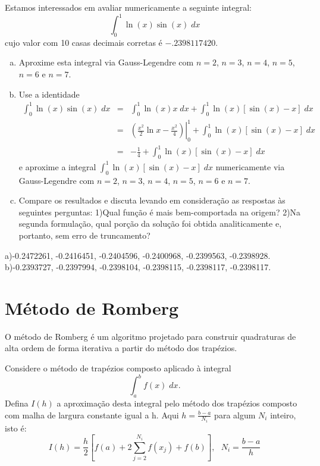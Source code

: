 \begin{exer}
Estamos interessados em avaliar numericamente a seguinte integral:
\begin{equation} \int_0^1 \ln(x)\sin(x)\;dx \end{equation}
cujo valor com 10 casas decimais corretas é $-.2398117420$.
\begin{enumerate}[a)]
\item Aproxime esta integral via Gauss-Legendre com $n=2$, $n=3$, $n=4$, $n=5$, $n=6$ e $n=7$.
\item Use a identidade
\begin{eqnarray}
\int_0^1 \ln(x)\sin(x)\;dx&=&\int_0^1 \ln(x)x\;dx+\int_0^1 \ln(x)\left[\sin(x)-x\right]\;dx\\
&=&\left.\left(\frac{x^2}{2}\ln x-\frac{x^2}{4}\right)\right|_0^1+\int_0^1 \ln(x)\left[\sin(x)-x\right]\;dx\\
&=&-\frac{1}{4}+\int_0^1 \ln(x)\left[\sin(x)-x\right]\;dx
\end{eqnarray}
e aproxime a integral $\int_0^1 \ln(x)\left[\sin(x)-x\right]\;dx$ numericamente via Gauss-Legendre com $n=2$, $n=3$, $n=4$, $n=5$, $n=6$ e $n=7$.
\item Compare os resultados e discuta levando em consideração as respostas às seguintes perguntas: 1)Qual função é mais bem-comportada na origem? 2)Na segunda formulação, qual porção da solução foi obtida analiticamente e, portanto, sem erro de truncamento?
\end{enumerate}
\end{exer}
\begin{resp}

    a)-0.2472261,  -0.2416451,  -0.2404596,  -0.2400968,  -0.2399563,  -0.2398928.
    b)-0.2393727,  -0.2397994,  -0.2398104,  -0.2398115,  -0.2398117,  -0.2398117.

\end{resp}

\section{Método de Romberg}
O método de Romberg é um algoritmo projetado para construir quadraturas de alta ordem de forma iterativa a partir do método dos trapézios.

Considere o método de trapézios composto aplicado à integral
\begin{equation} \int_a^bf(x)\;dx. \end{equation}
Defina $I(h)$ a aproximação desta integral pelo método dos trapézios composto com  malha de largura constante igual a h. Aqui $h=\frac{b-a}{N_i}$ para algum $N_i$ inteiro, isto é:
\begin{equation} I(h)=\frac{h}{2}\left[f(a)+2\sum_{j=2}^{N_i} f(x_j)+ f(b)\right],~~~N_i=\frac{b-a}{h} \end{equation}

